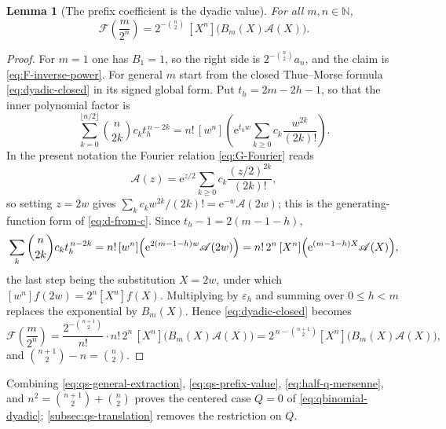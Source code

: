 \documentclass[11pt,oneside]{article}
\newtheorem{lemma}[theorem]{Lemma}
\theoremstyle{definition}
\theoremstyle{remark}
\newcommand{\N}{\mathbb N}
\newcommand{\e}{\mathrm e}
\begin{document}
\begin{lemma}[The prefix coefficient is the dyadic value]
\label{lem:qs-prefix-value}
For all $m,n\in\N$,
\begin{equation}
 \mathcal F\!\left(\frac m{2^n}\right)
 =2^{-\binom n2}\,[X^n]\bigl(B_m(X)\mathscr A(X)\bigr).   \label{eq:qs-prefix-value}
\end{equation}
\end{lemma}

\begin{proof}
For $m=1$ one has $B_1=1$, so the right side is $2^{-\binom n2}a_n$, and the claim is
\eqref{eq:F-inverse-power}.  For general $m$ start from the closed Thue--Morse formula
\eqref{eq:dyadic-closed} in its signed global form.  Put $t_h=2m-2h-1$, so that the inner
polynomial factor is
\begin{equation*}
 \sum_{k=0}^{\lfloor n/2\rfloor}\binom n{2k}c_kt_h^{\,n-2k}
 =n!\,[w^n]\left(\e^{t_hw}\sum_{k\ge0}c_k\frac{w^{2k}}{(2k)!}\right).
\end{equation*}
In the present notation the Fourier relation \eqref{eq:G-Fourier} reads
\begin{equation*}
 \mathscr A(z)=\e^{z/2}\sum_{k\ge0}c_k\frac{(z/2)^{2k}}{(2k)!},
\end{equation*}
so setting $z=2w$ gives $\sum_kc_kw^{2k}/(2k)!=\e^{-w}\mathscr A(2w)$; this is the
generating-function form of \eqref{eq:d-from-c}.  Since $t_h-1=2(m-1-h)$,
\begin{equation*}
 \sum_{k}\binom n{2k}c_kt_h^{\,n-2k}
 =n!\,[w^n]\Bigl(\e^{2(m-1-h)w}\mathscr A(2w)\Bigr)
 =n!\,2^n\,[X^n]\Bigl(\e^{(m-1-h)X}\mathscr A(X)\Bigr),
\end{equation*}
the last step being the substitution $X=2w$, under which $[w^n]f(2w)=2^n[X^n]f(X)$.
Multiplying by $\varepsilon_h$ and summing over $0\le h<m$ replaces the exponential by
$B_m(X)$.  Hence \eqref{eq:dyadic-closed} becomes
\begin{equation*}
 \mathcal F\!\left(\frac m{2^n}\right)
 =\frac{2^{-\binom{n+1}2}}{n!}\cdot n!\,2^n\,[X^n]\bigl(B_m(X)\mathscr A(X)\bigr)
 =2^{\,n-\binom{n+1}2}[X^n]\bigl(B_m(X)\mathscr A(X)\bigr),
\end{equation*}
and $\binom{n+1}2-n=\binom n2$.
\end{proof}

Combining \eqref{eq:qs-general-extraction}, \eqref{eq:qs-prefix-value},
\eqref{eq:half-q-mersenne}, and $n^2=\binom{n+1}2+\binom n2$ proves the centered case $Q=0$
of \eqref{eq:qbinomial-dyadic}; \cref{subsec:qs-translation} removes the restriction on $Q$.
\end{document}
